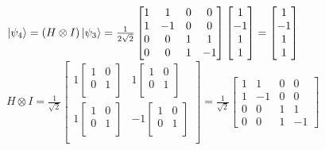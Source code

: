 \documentclass{iansnotes}
\begin{document}
\noindent $\ket{\psi_4} = (H \otimes I) \ket{\psi_3} = \frac{1}{2\sqrt{2}} \begin{bmatrix} 1 & 1 & 0 & 0 \\ 1 & -1 & 0 & 0 \\ 0 & 0 & 1 & 1 \\ 0 & 0 & 1 & -1 \end{bmatrix} \begin{bmatrix} 1 \\ -1 \\ 1 \\ 1 \end{bmatrix} = \begin{bmatrix} 1 \\ -1 \\ 1 \\ 1 \end{bmatrix}$ \\[16mm]
$H \otimes I = \frac{1}{\sqrt{2}} \begin{bmatrix}
  1 \begin{bmatrix} 1 & 0 \\ 0 & 1 \\ \end{bmatrix} & 1 \begin{bmatrix} 1 & 0 \\ 0 & 1 \\ \end{bmatrix} \\[5mm]
  1 \begin{bmatrix} 1 & 0 \\ 0 & 1 \\ \end{bmatrix} & -1 \begin{bmatrix} 1 & 0 \\ 0 & 1 \\ \end{bmatrix} \\
\end{bmatrix} = \frac{1}{\sqrt{2}} \begin{bmatrix} 1 & 1 & 0 & 0 \\ 1 & -1 & 0 & 0 \\ 0 & 0 & 1 & 1 \\ 0 & 0 & 1 & -1 \end{bmatrix}$
\end{document}

